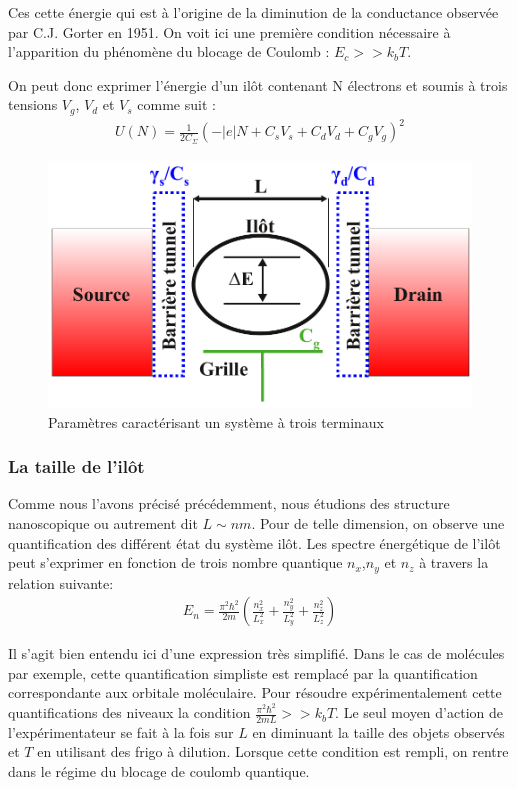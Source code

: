 Ces cette énergie qui est à l'origine de la diminution de la conductance observée par C.J. Gorter en 1951. On voit ici une première condition nécessaire à l'apparition du phénomène du blocage de Coulomb : $E_c >> k_bT$.

On peut donc exprimer l'énergie d'un il\^ot contenant N électrons et soumis à trois tensions $V_g$, $V_d$ et $V_s$ comme suit :
\begin{eqnarray}
U(N) = \frac{1}{2C_{\Sigma}} (-|e|N + C_sV_s + C_dV_d + C_gV_g)^2
\end{eqnarray}

\begin{figure}
\includegraphics[scale=1]{Theorie/Transport/figure1/figure1ThTr.pdf} 
\caption{Paramètres caractérisant un système à trois terminaux}
\label{description_systeme}
\end{figure}



\subsubsection{La taille de l'il\^ot}
Comme nous l'avons précisé précédemment, nous étudions des structure nanoscopique ou autrement dit $L\sim nm$. Pour de telle dimension, on observe une quantification des différent état du système il\^ot. Les spectre énergétique de l'il\^ot peut s'exprimer en fonction de trois nombre quantique $n_x$,$n_y$ et $n_z$ à travers la relation suivante:
\begin{eqnarray}
E_n = \frac{\pi^2 \hbar^2}{2m}(\frac{n_x^2}{L_x^2} + \frac{n_y^2}{L_y^2} + \frac{n_z^2}{L_z^2}) \nonumber
\end{eqnarray}


Il s'agit bien entendu ici d'une expression très simplifié. Dans le cas de molécules par exemple, cette quantification simpliste est remplacé par la quantification correspondante aux orbitale moléculaire. Pour résoudre expérimentalement cette quantifications des niveaux la condition $\frac{\pi^2 \hbar^2}{2mL} >> k_bT$. Le seul moyen d'action de l'expérimentateur se fait à la fois sur $L$ en diminuant la taille des objets observés et $T$ en utilisant des frigo à dilution. Lorsque cette condition est rempli, on rentre dans le régime du blocage de coulomb quantique.
\newline


